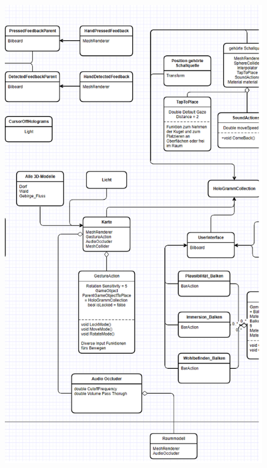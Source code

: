 \documentclass[a4paper,12pt]{scrreprt}
\begin{document}
\newpage
\begin{figure}[H]
\centering
\includegraphics[width = 21cm, height = 26cm]{UML_2.png}
\end{figure} 
\newpage
\end{document}
